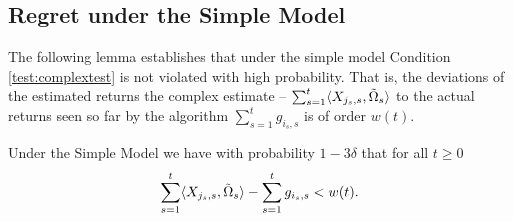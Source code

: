 \subsection{Regret under the Simple Model}
The following lemma establishes that under the simple model Condition \eqref{test:complextest} is not violated with high probability. That is, the deviations of the estimated returns the complex estimate -- $\sum_{s=1}^t \langle X_{j_s,s}, \tilde{\Omega}_s \rangle $ to the actual returns seen so far by the algorithm $\sum_{s=1}^t g_{i_s,s}$ is of order $w(t)$.
\begin{lemma} \label{lem:conditionnotviolatedundersimple}
Under the Simple Model we have with probability $1-3\delta$ that for all $t\ge 0$
\begin{align*}
    \sum_{s=1}^t \langle X_{j_s,s}, \tilde{\Omega}_s \rangle - \sum_{s=1}^t g_{i_s,s} < w(t).
\end{align*}
\end{lemma}

